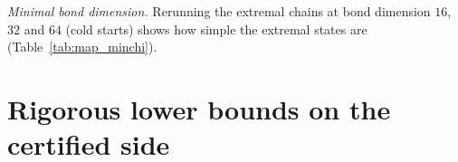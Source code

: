 \documentclass[aps,prx,onecolumn,10pt,nofootinbib,longbibliography,floatfix]{revtex4-2}
\theoremstyle{remark}
\newcommand{\Jz}{J_z}
\newcommand{\ms}{m_s}
\begin{document}
\def\SMcap{The two explicit pure witnesses of $\ms$ at $n=57$, $\Jz=1.6$ (Lemma~B). Each column is one end of the %
window: the pure state $\alpha|a\rangle+\beta|b\rangle$ built from two stored matrix-product states $|a\rangle$,
$|b\rangle$, with $(\alpha,\beta)$ from the $2\times2$ compression of $(H,\ms)$ to their span. Read down a column: the %
pure state has the energy and the label of the mixture it replaces, lies in the sector, and is below the threshold
$E_{\rm lo}$. Energies in units of the exchange coupling.}\def\SMlab{tab:map_th_witness}


\emph{Minimal bond dimension.} Rerunning the extremal chains at bond dimension $16$, $32$ and $64$ (cold starts) shows %
how simple the extremal states are (Table~\ref{tab:map_minchi}).

\def\SMcap{Minimal-bond-dimension witnesses: the extremal chains rerun at small bond dimension (cold starts).
$E_0(\text{bond dim.})-E_0$: how far the ground energy at that bond dimension lies above the reference; %
$D_{\rm pure}$: the width attained by the best two pure states below $E_{\rm lo}$; last column: its fraction of the
pure-state width found at the full bond dimension. Read down a block: bond dimension $32$ already gives almost the full %
width.}\def\SMlab{tab:map_minchi}


\section{Rigorous lower bounds on the certified side}
\label{sm:rigor}
\end{document}
